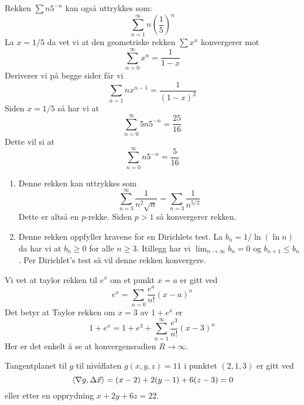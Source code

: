 \oppgave
\deloppgave
Rekken $\sum n5^{-n}$ kan også uttrykkes som:
$$
\sum_{n = 1}^\infty n\left(\frac{1}{5}\right)^n
$$
La $x = 1/5$ da vet vi at den geometriske rekken $\sum x^n$ konvergerer mot
$$
\sum_{n = 0}^\infty x^n = \frac{1}{1-x}
$$
Deriverer vi på begge sider får vi
$$
\sum_{n = 1} nx^{n-1} = \frac{1}{(1-x)^2}
$$
Siden $x = 1/5$ så har vi at
$$
\sum_{n = 0}^\infty 5n5^{-n} = \frac{25}{16}
$$
Dette vil si at 
$$
\sum_{n = 0}^\infty n5^{-n} = \frac{5}{16}
$$

\begin{enumerate}
	\item Denne rekken kan uttrykkes som
	$$
	\sum_{n = 3}^\infty \frac{1}{n^2\sqrt{n}} = \sum_{n = 3} \frac{1}{n^{5/2}}
	$$
	Dette er altså en $p$-rekke. Siden $p > 1$ så konvergerer rekken.
	
	\item Denne rekken oppfyller kravene for en Dirichlets test. La $b_n = 1/\ln(\ln n)$ da har vi at $b_n \geq 0$ for alle $n \geq 3$. Itillegg har vi $\lim_{n \to \infty} b_n = 0$ og $b_{n+1} \leq b_n$. Per Dirichlet's test så vil denne rekken konvergere.
\end{enumerate}

\deloppgave
Vi vet at taylor rekken til $e^x$ om et punkt $x = a$ er gitt ved
$$
e^{x} = \sum_{n = 0}\frac{e^a}{n!}(x - a)^n
$$
Det betyr at Taylor rekken om $x = 3$ av $1 + e^x$ er
$$
1 + e^x = 1 + e^3 + \sum_{n = 1}^\infty \frac{e^3}{n!}(x - 3)^n
$$
Her er det enkelt å se at konvergensradien $R \to \infty$.

\oppgave
Tangentplanet til $g$ til nivåflaten $g(x, y, z) = 11$ i punktet $(2, 1, 3)$ er gitt ved
$$
\,\left\langle \nabla g, \Delta \vec{x}\right\rangle = (x - 2) + 2(y - 1) + 6(z - 3) = 0
$$
eller etter en opprydning $x + 2y + 6z = 22$.

\clearpage